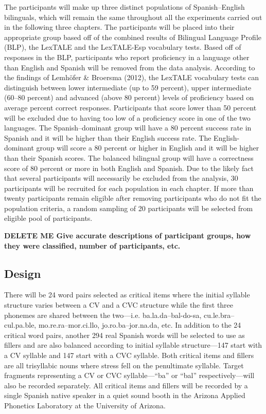 The participants will make up three distinct populations of Spanish–English bilinguals, which will remain the same throughout all the experiments carried out in the following three chapters. The participants will be placed into their appropriate group based off of the combined results of Bilingual Language Profile (BLP), the LexTALE and the LexTALE-Esp vocabulary tests. Based off of responses in the BLP, participants who report proficiency in a language other than English and Spanish will be removed from the data analysis. According to the findings of Lemhöfer \& Broersma (2012), the LexTALE vocabulary tests can distinguish between lower intermediate (up to 59 percent), upper intermediate (60–80 percent) and advanced (above 80 percent) levels of proficiency based on average percent correct responses. Participants that score lower than 50 percent will be excluded due to having too low of a proficiency score in one of the two languages. The Spanish–dominant group will have a 80 percent success rate in Spanish and it will be higher than their English success rate. The English-dominant group will score a 80 percent or higher in English and it will be higher than their Spanish scores. The balanced bilingual group will have a correctness score of 80 percent or more in both English and Spanish. Due to the likely fact that several participants will necessarily be excluded from the analysis, 30 participants will be recruited for each population in each chapter. If more than twenty participants remain eligible after removing participants who do not fit the population criteria, a random sampling of 20 participants will be selected from eligible pool of participants.

\textbf{DELETE ME Give accurate descriptions of participant groups, how they were classified, number of participants, etc.}


\subsection{Design}

There will be 24 word pairs selected as critical items where the initial syllable structure varies between a CV and a CVC structure while the first three phonemes are shared between the two—i.e. ba.la.da–bal-do-sa, cu.le.bra–cul.pa.ble, mo.re.ra–mor.ci.llo, jo.ro.ba–jor.na.da, etc. In addition to the 24 critical word pairs, another 294 real Spanish words will be selected to use as fillers and are also balanced according to initial syllable structure—147 start with a CV syllable and 147 start with a CVC syllable. Both critical items and fillers are all trisyllabic nouns where stress fell on the penultimate syllable. Target fragments representing a CV or CVC syllable—“ba” or “bal” respectively—will also be recorded separately. All critical items and fillers will be recorded by a single Spanish native speaker in a quiet sound booth in the Arizona Applied Phonetics Laboratory at the University of Arizona. 

